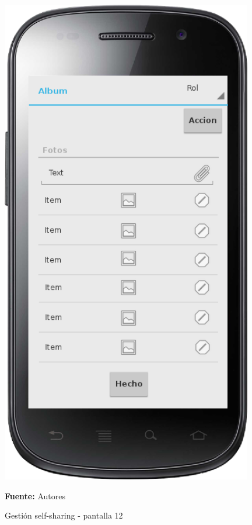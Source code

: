 \begin{figure}[!htb]
  \begin{center}
    \includegraphics[width=11cm]{./imagenes/UI/Self_sharing/self_sharing_12.png}
    \caption{Gestión self-sharing - pantalla 12}
    \label{fig:self_sharing_12}
    \textbf{Fuente:}  Autores
  \end{center}
\end{figure}

